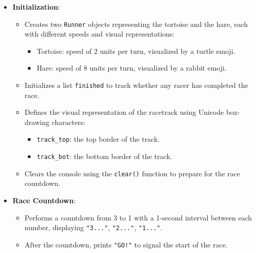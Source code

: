 \begin{homeworkProblem}
\begin{itemize}
  \item \textbf{Initialization}:
    \begin{itemize}
      \item Creates two \texttt{Runner} objects representing the tortoise and the hare, each with different speeds and visual representations:
        \begin{itemize}
          \item Tortoise: speed of 2 units per turn, visualized by a turtle emoji.
          \item Hare: speed of 8 units per turn, visualized by a rabbit emoji.
        \end{itemize}
      \item Initializes a list \texttt{finished} to track whether any racer has completed the race.
      \item Defines the visual representation of the racetrack using Unicode box-drawing characters:
        \begin{itemize}
          \item \texttt{track\_top}: the top border of the track.
          \item \texttt{track\_bot}: the bottom border of the track.
        \end{itemize}
      \item Clears the console using the \texttt{clear()} function to prepare for the race countdown.
    \end{itemize}

  \item \textbf{Race Countdown}:
    \begin{itemize}
      \item Performs a countdown from 3 to 1 with a 1-second interval between each number, displaying \texttt{"3..."}, \texttt{"2..."}, \texttt{"1..."}.
      \item After the countdown, prints \texttt{"GO!"} to signal the start of the race.
    \end{itemize}


\end{itemize}
\end{homeworkProblem}
